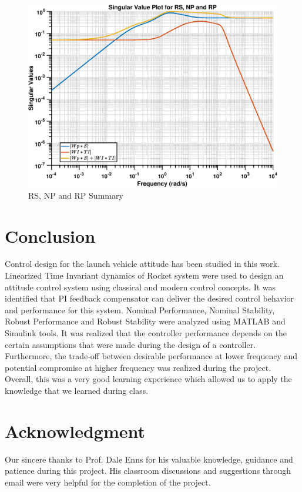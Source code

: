 \documentclass[12pt]{article}
\begin{document}
\begin{itemize}
		\begin{figure}[H]
			\centering
			\includegraphics[width=0.9\linewidth]{Summary}
			\caption{RS, NP and RP Summary}
			\label{fig:summary}
		\end{figure}
	\end{itemize}
	
	\section*{Conclusion}
	Control design for the launch vehicle attitude has been studied in this work. Linearized Time Invariant dynamics of Rocket system were used to design an attitude control system using classical and modern control concepts. It was identified that PI feedback compensator can deliver the desired control behavior and performance for this system. Nominal Performance, Nominal Stability, Robust Performance and Robust Stability were analyzed using MATLAB and Simulink tools. It was realized that the controller performance depends on the certain assumptions that were made during the design of a controller. Furthermore, the trade-off between desirable performance at lower frequency and potential compromise at higher frequency was realized during the project. Overall, this was a very good learning experience which allowed us to apply the knowledge that we learned during class. 
	
	\section*{Acknowledgment}
	Our sincere thanks to Prof. Dale Enns for his valuable knowledge, guidance and patience during this project. His classroom discussions and suggestions through email were very helpful for the completion of the project.
	
\end{document}

